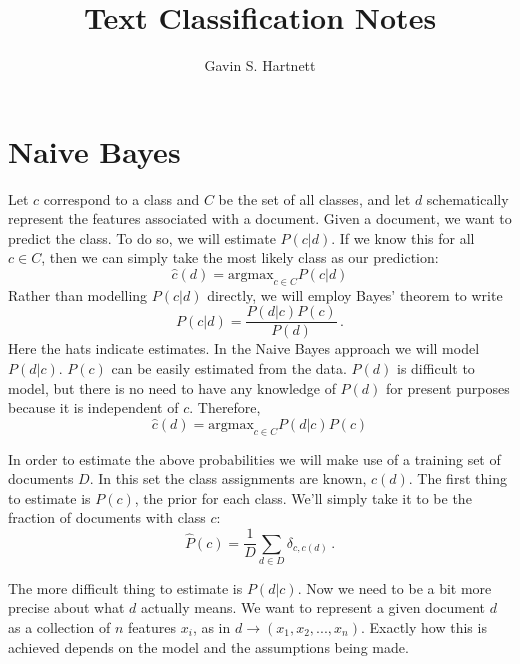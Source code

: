 \documentclass[a4paper,12pt]{article}
\title{\vspace{-1.7 cm} Text Classification Notes}
\author{Gavin S. Hartnett}
\date{}
\begin{document}
\maketitle
\vspace{-0.5cm}

\section{Naive Bayes}
Let $c$ correspond to a class and $C$ be the set of all classes, and let $d$ schematically represent the features associated with a document. Given a document, we want to predict the class. To do so, we will estimate $P(c|d)$. If we know this for all $c \in C$, then we can simply take the most likely class as our prediction:
\begin{equation}
\hat{c}(d) = \text{argmax}_{c \in C} P(c|d) 
\end{equation}
Rather than modelling $P(c|d)$ directly, we will employ Bayes' theorem to write
\begin{equation}
P(c|d) = \frac{P(d|c) P(c)}{P(d)} \, .
\end{equation}
Here the hats indicate estimates. In the Naive Bayes approach we will model $P(d|c)$. $P(c)$ can be easily estimated from the data. $P(d)$ is difficult to model, but there is no need to have any knowledge of $P(d)$ for present purposes because it is independent of $c$. Therefore, 
\begin{equation}
\hat{c}(d) = \text{argmax}_{c \in C} P(d|c)P(c)
\end{equation}

In order to estimate the above probabilities we will make use of a training set of documents $D$. In this set the class assignments are known, $c(d)$. The first thing to estimate is
$P(c)$, the prior for each class. We'll simply take it to be the fraction of documents with class $c$:
\begin{equation}
\hat{P}(c) = \frac{1}{D} \sum_{d \in D} \delta_{c,c(d)} \, .
\end{equation}

The more difficult thing to estimate is $P(d|c)$. Now we need to be a bit more precise about what $d$ actually means. We want to represent a given document $d$ as a collection of $n$ features $x_i$, as in $d \rightarrow (x_1, x_2, ... , x_n)$. Exactly how this is achieved depends on the model and the assumptions being made.
\end{document}
